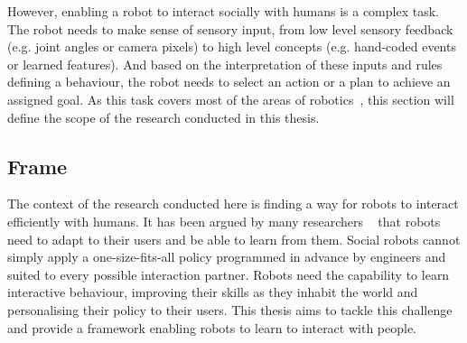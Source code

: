 


However, enabling a robot to interact socially with humans is a complex task. The robot needs to make sense of sensory input, from low level sensory feedback (e.g. joint angles or camera pixels) to high level concepts (e.g. hand-coded events or learned features). And based on the interpretation of these inputs and rules defining a behaviour, the robot needs to select an action or a plan to achieve an assigned goal. As this task covers most of the areas of robotics~\citep{fong2003survey}, this section will define the scope of the research conducted in this thesis.

\subsection{Frame}

The context of the research conducted here is finding a way for robots to interact efficiently with humans. It has been argued by many researchers ~\citep{dautenhahn2004robots,billard2008robot} that robots need to adapt to their users and be able to learn from them. Social robots cannot simply apply a one-size-fits-all policy programmed in advance by engineers and suited to every possible interaction partner. Robots need the capability to learn interactive behaviour, improving their skills as they inhabit the world and personalising their policy to their users. This thesis aims to tackle this challenge and provide a framework enabling robots to learn to interact with people.

